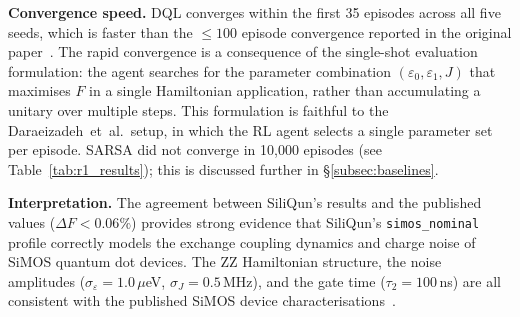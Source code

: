 \begin{table}[ht]
\centering
\caption{Replication~1 results: DQL, SARSA, and PPO on SiliQun
  \texttt{simos\_nominal} profile (3--5 seeds each), shown side by side
  with the published values of Daraeizadeh~et~al.~\cite{Daraeizadeh2020}.
  PPO results: Aziz A100, job~179132, 20{,}000 episodes, 5 seeds (completed 2026-05-31).
  Published target: $F > 0.999$.
  $\Delta F$ = absolute deviation from published threshold.
  Conv.\ ep.\ = episode at which $F > 0.999$ was first achieved
  (\textemdash{} = did not converge).}
\label{tab:r1_results}
\end{table}

\textbf{Convergence speed.} DQL converges within the first 35 episodes
across all five seeds, which is faster than the $\leq 100$ episode
convergence reported in the original paper~\cite{Daraeizadeh2020}.
The rapid convergence is a consequence of the single-shot evaluation
formulation: the agent searches for the parameter combination
$(\varepsilon_0, \varepsilon_1, J)$ that maximises $F$ in a single
Hamiltonian application, rather than accumulating a unitary over multiple
steps.
This formulation is faithful to the Daraeizadeh~et~al.\ setup, in which
the RL agent selects a single parameter set per episode.
SARSA did not converge in 10{,}000 episodes (see Table~\ref{tab:r1_results});
this is discussed further in \S\ref{subsec:baselines}.

\textbf{Interpretation.} The agreement between SiliQun's results and the
published values ($\Delta F < 0.06\%$) provides strong evidence that
SiliQun's \texttt{simos\_nominal} profile correctly models the exchange
coupling dynamics and charge noise of SiMOS quantum dot devices.
The ZZ Hamiltonian structure, the noise amplitudes
($\sigma_\varepsilon = 1.0$\,$\mu$eV, $\sigma_J = 0.5$\,MHz), and the
gate time ($\tau_2 = 100$\,ns) are all consistent with the published
SiMOS device characterisations~\cite{Xue2022,Noiri2022,Philips2022}.

